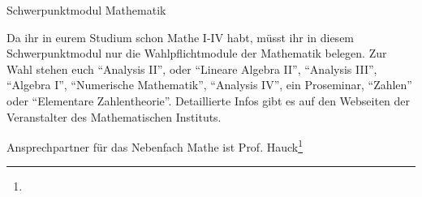 
Schwerpunktmodul Mathematik

Da ihr in eurem Studium schon Mathe I-IV habt, müsst ihr in diesem Schwerpunktmodul nur die Wahlpflichtmodule
der Mathematik belegen. Zur Wahl stehen euch "`Analysis II"', oder "`Lineare Algebra II"', "`Analysis III"',
"`Algebra I"', "`Numerische Mathematik"', "`Analysis IV"', ein Proseminar, "`Zahlen"' oder "`Elementare Zahlentheorie"'.
Detaillierte Infos gibt es auf den Webseiten der Veranstalter des Mathematischen Instituts.
\nopagebreak

Ansprechpartner für das Nebenfach Mathe ist Prof. Hauck\footnote{}
